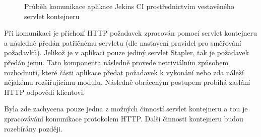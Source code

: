             \begin{figure}[h!t]
                \begin{center}
                    \caption{Průběh komunikace aplikace Jekins CI prostřednictvím vestavěného servlet kontejneru}
                    \label{imgKomunikace}
                \end{center}
            \end{figure}

            Při komunikaci je příchozí HTTP požadavek zpracován pomocí servlet kontejneru 
            a následně předán patřičnému servletu (dle nastavení pravidel pro směřování požadavků).
            Jelikož je v aplikaci pouze jediný servlet Stapler, tak je požadavek předán jemu.
            Tato komponenta následně provede netriviálním způsobem rozhodnutí, které
            části aplikace předat požadavek k vykonání  nebo zda náleží nějakému rozšiřujícímu modulu.
            Následně obráceným postupem probíhá zaslání HTTP odpovědi klientovi.

            Byla zde zachycena pouze jedna z možných činností
            servlet kontejneru a tou je zpracovávání komunikace protokolem HTTP. 
            Další činnosti kontejneru budou rozebírány později.

